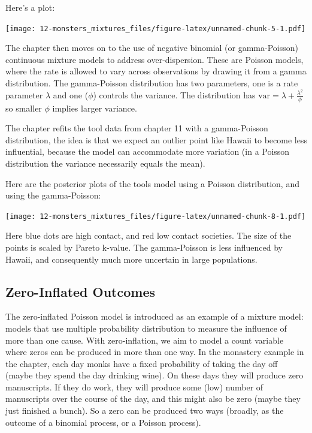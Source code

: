 \documentclass[
]{book}
\begin{document}
Here's a plot:

\texttt{[image: 12-monsters\_mixtures\_files/figure-latex/unnamed-chunk-5-1.pdf]}

The chapter then moves on to the use of negative binomial (or gamma-Poisson) continuous mixture models to address over-dispersion. These are Poisson models, where the rate is allowed to vary across observations by drawing it from a gamma distribution. The gamma-Poisson distribution has two parameters, one is a rate parameter \(\lambda\) and one (\(\phi\)) controls the variance. The distribution has \(\text{var} = \lambda + \frac{\lambda^2}{\phi}\) so smaller \(\phi\) implies larger variance.

The chapter refits the tool data from chapter 11 with a gamma-Poisson distribution, the idea is that we expect an outlier point like Hawaii to become less influential, because the model can accommodate more variation (in a Poisson distribution the variance necessarily equals the mean).

Here are the posterior plots of the tools model using a Poisson distribution, and using the gamma-Poisson:

\texttt{[image: 12-monsters\_mixtures\_files/figure-latex/unnamed-chunk-8-1.pdf]}

Here blue dots are high contact, and red low contact societies. The size of the points is scaled by Pareto k-value. The gamma-Poisson is less influenced by Hawaii, and consequently much more uncertain in large populations.

\hypertarget{zero-inflated-outcomes}{%
\subsection*{Zero-Inflated Outcomes}\label{zero-inflated-outcomes}}

The zero-inflated Poisson model is introduced as an example of a mixture model: models that use multiple probability distribution to measure the influence of more than one cause. With zero-inflation, we aim to model a count variable where zeros can be produced in more than one way. In the monastery example in the chapter, each day monks have a fixed probability of taking the day off (maybe they spend the day drinking wine). On these days they will produce zero manuscripts. If they do work, they will produce some (low) number of manuscripts over the course of the day, and this might also be zero (maybe they just finished a bunch). So a zero can be produced two ways (broadly, as the outcome of a binomial process, or a Poisson process).
\end{document}
